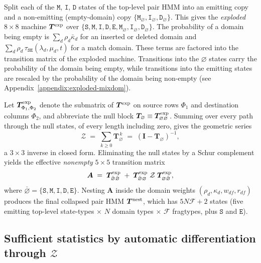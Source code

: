 \documentclass{article}
\newcommand{\ins}{\lambda}
\newcommand{\del}{\mu}
\newcommand{\hst}[1]{\texttt{#1}}
\newcommand{\Tnull}{\bm{T}_{\varnothing}}
\newcommand{\Zsum}{\mathcal{Z}}
\newcommand{\Aeff}{\bm{A}}
\begin{document}
Split each of the $\hst{M}$, $\hst{I}$, $\hst{D}$ states of the
top-level pair HMM into an
emitting copy and a non-emitting (empty-domain) copy
$\{\hst{M}_\varnothing,\hst{I}_\varnothing,\hst{D}_\varnothing\}$. This gives the
\emph{exploded} $8{\times}8$ machine
$\bm{T}^{\rm exp}$ over $\{\hst{S},\hst{M},\hst{I},\hst{D},\hst{E},
\hst{M}_\varnothing,\hst{I}_\varnothing,
\hst{D}_\varnothing\}$.
The probability of a domain being empty is $\sum_d\rho_d\bar\kappa_d$
for an inserted or deleted domain and 
$\sum_d\rho_d\,\tau_{\hst{S}\hst{E}}(\ins_d,\del_d,t)$ for a match domain.
These terms are factored into the transition matrix of the exploded machine.
Transitions into the $\varnothing$ states carry the probability of the domain being empty, while transitions into the emitting states are rescaled by the probability of the domain being non-empty
(see Appendix~\ref{appendix:exploded-mixdom}).

Let $\bm{T}^{\rm exp}_{\Phi_1,\Phi_2}$ denote the submatrix of
$\bm{T}^{\rm exp}$ on source rows $\Phi_1$ and destination columns
$\Phi_2$, and abbreviate the null block
$\Tnull\equiv\bm{T}^{\rm exp}_{\varnothing\varnothing}$. 
Summing over every path through the null states, of every length including 
zero, gives the geometric series
\begin{equation}
\label{eq:nullsum}
\Zsum \;=\; \sum_{k\ge0}\Tnull^{\,k}
        \;=\;(\bm{I}-\Tnull)^{-1},
\end{equation}
a $3{\times}3$ inverse in closed form. Eliminating the null states by a 
Schur complement yields the effective \emph{nonempty} $5{\times}5$ 
transition matrix
\begin{equation}
\label{eq:Aeff}
\Aeff \;=\; \bm{T}^{\rm exp}_{\bar\varnothing\bar\varnothing}
      \;+\; \bm{T}^{\rm exp}_{\bar\varnothing\varnothing}\;\Zsum\;
            \bm{T}^{\rm exp}_{\varnothing\bar\varnothing},
\end{equation}
where $\bar\varnothing=\{\hst{S},\hst{M},\hst{I},\hst{D},\hst{E}\}$.
Nesting $\Aeff$ inside the domain
weights $(\rho_d,\kappa_d,w_{df},r_{df})$ produces the final collapsed
pair HMM $\bm{T}^{\rm nest}$, which has $5N \mathcal F {+}2$ states (five emitting
top-level state-types $\times$ $N$ domain types $\times$ $\mathcal F$ fragtypes,
plus $\hst{S}$ and $\hst{E}$).

\subsection{Sufficient statistics by automatic differentiation through \texorpdfstring{$\Zsum$}{Z}}
\end{document}
